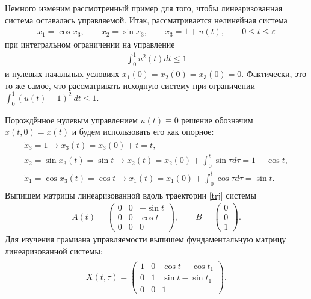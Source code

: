 \documentclass[../main.tex]{subfiles}
\begin{document}
 Немного изменим рассмотренный пример для того, чтобы линеаризованная система оставалась управляемой. 
Итак, рассматривается нелинейная система
 \begin{gather}\label{unicycle1}
 \dot{x}_1 = \cos x_3, \qquad
 \dot{x}_2 = \sin x_3, \qquad
 \dot{x}_3 = 1 + u(t), \qquad 0 \leqslant t \leqslant \varepsilon
 \end{gather}
 при интегральном ограничении на управление 
 \begin{gather*}
 \int_0^1 u^2(t) dt \leqslant 1
 \end{gather*}
 и нулевых начальных условиях $ x_1(0) = x_2(0) = x_3(0) = 0 $. 
Фактически, это то же самое, что рассматривать исходную систему при ограничении $ \displaystyle{\int_0^1} \left( u(t) - 1\right)^2 \ dt \leqslant 1$.
\pagebreak
 
 Порождённое нулевым управлением $ u(t) \equiv 0 $ решение обозначим $ x(t,0) = x(t) $ и будем использовать его как опорное:
 \begin{gather}\label{trj}
 \begin{gathered}
 \dot{x}_3 = 1 \longrightarrow x_3(t) = x_3(0) + t = t, \\
 \dot{x}_2 = \sin x_3(t) = \sin t \longrightarrow x_2(t) = x_2(0) + \int_0^t \sin \tau d\tau = 1 - \cos t,\\
 \dot{x}_1 = \cos x_3(t) = \cos t \longrightarrow x_1(t) = x_1(0) + \int_0^t \cos \tau d\tau = \sin t.
 \end{gathered}
 \end{gather}
 Выпишем матрицы линеаризованной вдоль траектории \eqref{trj} системы 
 \begin{gather*}
 A(t) = \begin{pmatrix}
 0 & 0 & -\sin t \\ 
 0 & 0 & \cos t \\ 
 0 & 0 & 0
 \end{pmatrix}, \qquad B = \begin{pmatrix}
 0 \\ 
 0 \\ 
 1
 \end{pmatrix}.
 \end{gather*}
 Для изучения грамиана управляемости выпишем фундаментальную матрицу линеаризованной системы:
 \begin{gather*}
 \begin{gathered}
 X(t,\tau) = \begin{pmatrix}
 1 & 0 & \cos t-\cos t_1 \\ 
 0 & 1 & \sin t-\sin t_1 \\ 
 0 & 0 & 1
 \end{pmatrix}.
 \end{gathered} 
 \end{gather*}
\end{document}
